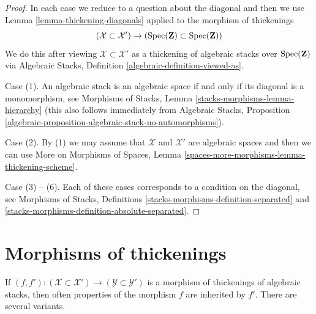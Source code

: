 \begin{proof}
In each case we reduce to a question about the diagonal and then
we use Lemma \ref{lemma-thickening-diagonals} applied to the
morphism of thickenings
$$
(\mathcal{X} \subset \mathcal{X}') \to
\left(\mathop{\mathrm{Spec}}(\mathbf{Z}) \subset \mathop{\mathrm{Spec}}(\mathbf{Z})\right)
$$
We do this after viewing
$\mathcal{X} \subset \mathcal{X}'$ as a thickening of algebraic stacks
over $\mathop{\mathrm{Spec}}(\mathbf{Z})$ via
Algebraic Stacks, Definition \ref{algebraic-definition-viewed-as}.

\medskip\noindent
Case (1). An algebraic stack is an algebraic space if and only if its
diagonal is a monomorphism, see
Morphisms of Stacks, Lemma \ref{stacks-morphisms-lemma-hierarchy}
(this also follows immediately from Algebraic Stacks,
Proposition \ref{algebraic-proposition-algebraic-stack-no-automorphisms}).

\medskip\noindent
Case (2). By (1) we may assume that $\mathcal{X}$ and $\mathcal{X}'$
are algebraic spaces and then we can use
More on Morphisms of Spaces, Lemma
\ref{spaces-more-morphisms-lemma-thickening-scheme}.

\medskip\noindent
Case (3) -- (6). Each of these cases corresponds to a condition
on the diagonal, see Morphisms of Stacks, Definitions
\ref{stacks-morphisms-definition-separated} and
\ref{stacks-morphisms-definition-absolute-separated}.
\end{proof}









\section{Morphisms of thickenings}
\label{section-morphisms-thickenings}

\noindent
If $(f, f') : (\mathcal{X} \subset \mathcal{X}') \to
(\mathcal{Y} \subset \mathcal{Y}')$ is a morphism
of thickenings of algebraic stacks, then often properties of the morphism
$f$ are inherited by $f'$. There are several variants.

